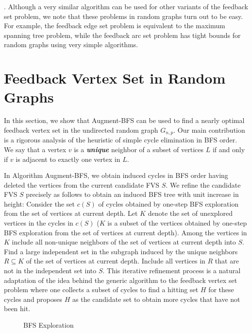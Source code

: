 \documentclass[11pt]{article}
\begin{document}
. Although a very similar algorithm can be used for other variants of the feedback set problem, we note that these problems in random graphs turn out to be easy. For example, the feedback edge set problem is equivalent to the maximum spanning tree problem, while the feedback arc set problem has tight bounds for random graphs using very simple algorithms.


\section{Feedback Vertex Set in Random Graphs}
In this section, we show that Augment-BFS can be used to find a nearly optimal feedback vertex set in the undirected random graph $G_{n,p}$. Our main contribution is a rigorous analysis of the heuristic of simple cycle elimination in BFS order. We say that a vertex $v$ is a {\bf \emph{unique}} neighbor of a subset of vertices $L$ if and only if $v$ is adjacent to exactly one vertex in $L$.

In Algorithm Augment-BFS, we obtain induced cycles in BFS order having deleted the vertices from the current candidate FVS $S$. We refine the candidate
FVS $S$ precisely as follows to obtain an induced BFS tree with unit increase in height: Consider the set $c(S)$ of cycles obtained by one-step BFS exploration from the set of vertices at current depth. Let $K$ denote the set of unexplored vertices in the cycles in $c(S)$ ($K$ is a subset of the vertices obtained by one-step BFS exploration from the set of vertices at current depth). Among the vertices in $K$ include all non-unique neighbors of the set of vertices at current depth into $S$. Find a large independent set in the subgraph induced by the unique neighbors $R\subseteq K$ of the set of vertices at current depth. Include all vertices in $R$ that are not in the independent set into $S$. This iterative refinement process is a natural adaptation of the idea behind the generic algorithm to the feedback vertex set problem where one collects a subset of cycles to find a hitting set $H$ for these cycles and proposes $H$ as the candidate set to obtain more cycles that have not been hit.

\begin{figure}[H]
\label{fig:bfs-exploration}
\begin{center}
\end{center}
\caption{BFS Exploration}
\end{figure}
\end{document}
